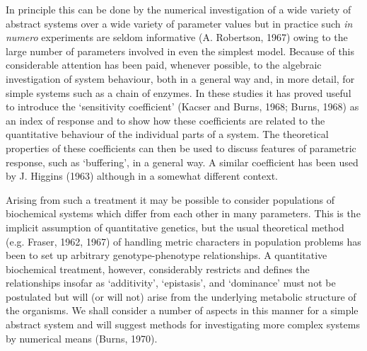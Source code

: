 In principle this can be done by the numerical investigation of a wide variety of abstract systems over a wide variety of parameter values but in practice such {\em in numero} experiments are seldom informative (A. Robertson, 1967) owing to the large number of parameters involved in even the simplest model. Because of this considerable attention has been paid, whenever possible, to the algebraic investigation of system behaviour, both in a general way and, in more detail, for simple systems such as a chain of enzymes. In these studies it has proved useful to introduce the `sensitivity coefficient' (Kacser and Burns, 1968; Burns, 1968) as an index of response and to show how these coefficients are related to the quantitative behaviour of the individual parts of a system. The theoretical properties of these coefficients can then be used to discuss features of parametric response, such as `buffering', in a general way. A similar coefficient has been used by J. Higgins (1963) although in a somewhat different context.

Arising from such a treatment it may be possible to consider populations of biochemical systems which differ from each other in many parameters. This is the implicit assumption of quantitative genetics, but the usual theoretical method (e.g. Fraser, 1962, 1967) of handling metric characters in population problems has been to set up arbitrary genotype-phenotype relationships. A quantitative biochemical treatment, however, considerably restricts and defines the relationships insofar as `additivity', `epistasis', and `dominance' must not be postulated but will (or will not) arise from the underlying metabolic structure of the organisms. We shall consider a number of aspects in this manner for a simple abstract system and will suggest methods for investigating more complex systems by numerical means (Burns, 1970). 